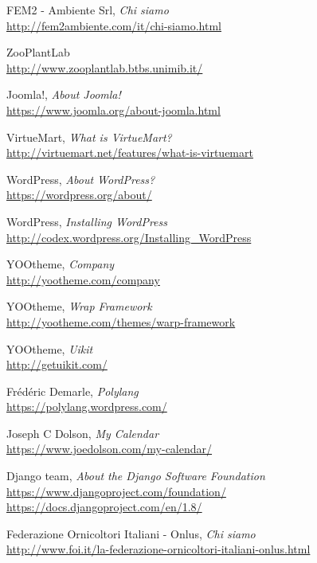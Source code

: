 \begin{thebibliography}{99}

	FEM2 - Ambiente Srl, \emph{Chi siamo} \\
	\url{http://fem2ambiente.com/it/chi-siamo.html}

	ZooPlantLab \\
	\url{http://www.zooplantlab.btbs.unimib.it/}

	Joomla!, \emph{About Joomla!} \\
	\url{https://www.joomla.org/about-joomla.html}

	VirtueMart, \emph{What is VirtueMart?} \\
	\url{http://virtuemart.net/features/what-is-virtuemart}
	
	WordPress, \emph{About WordPress?} \\
	\url{https://wordpress.org/about/}
	
	WordPress, \emph{Installing WordPress} \\
	\url{http://codex.wordpress.org/Installing_WordPress}	
	
	YOOtheme, \emph{Company} \\
	\url{http://yootheme.com/company}	

	YOOtheme, \emph{Wrap Framework} \\
	\url{http://yootheme.com/themes/warp-framework}	
	
	YOOtheme, \emph{Uikit} \\
	\url{http://getuikit.com/}	

	Frédéric Demarle, \emph{Polylang} \\
	\url{https://polylang.wordpress.com/}	

	Joseph C Dolson, \emph{My Calendar} \\
	\url{https://www.joedolson.com/my-calendar/}

	Django team, \emph{About the Django Software Foundation} \\
	\url{https://www.djangoproject.com/foundation/} \\
	\url{https://docs.djangoproject.com/en/1.8/}

	Federazione Ornicoltori Italiani - Onlus, \emph{Chi siamo} \\
	\url{http://www.foi.it/la-federazione-ornicoltori-italiani-onlus.html}


\end{thebibliography}
